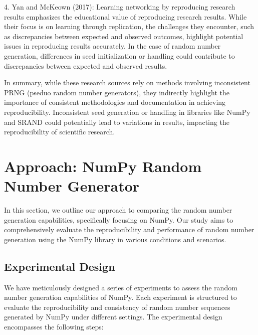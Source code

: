 \documentclass{article}
\begin{document}
4. Yan and McKeown (2017): Learning networking by reproducing research results emphasizes the educational value of reproducing research results. While their focus is on learning through replication, the challenges they encounter, such as discrepancies between expected and observed outcomes, highlight potential issues in reproducing results accurately. In the case of random number generation, differences in seed initialization or handling could contribute to discrepancies between expected and observed results.

In summary, while these research sources rely on methods involving inconsistent PRNG (pseduo random number generators), they indirectly highlight the importance of consistent methodologies and documentation in achieving reproducibility. Inconsistent seed generation or handling in libraries like NumPy and SRAND could potentially lead to variations in results, impacting the reproducibility of scientific research.


\section*{Approach: NumPy Random Number Generator}

In this section, we outline our approach to comparing the random number generation capabilities, specifically focusing on NumPy. Our study aims to comprehensively evaluate the reproducibility and performance of random number generation using the NumPy library in various conditions and scenarios.

\subsection*{Experimental Design}

We have meticulously designed a series of experiments to assess the random number generation capabilities of NumPy. Each experiment is structured to evaluate the reproducibility and consistency of random number sequences generated by NumPy under different settings. The experimental design encompasses the following steps:
\end{document}
